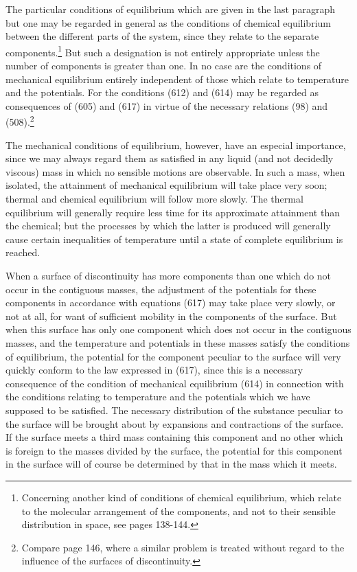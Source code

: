 \documentclass[12pt]{memoir}
\begin{document}
The particular conditions of equilibrium which are given in the last paragraph but one may be regarded in general as the conditions of chemical equilibrium  between the different parts of the system, since they relate to the separate components.\footnote{Concerning another kind of conditions of chemical equilibrium, which relate to the molecular arrangement of the components, and not to their sensible distribution in space, see pages 138-144.} But such a designation is not entirely appropriate unless the number of components is greater than one. In no case are the conditions of mechanical equilibrium entirely independent of those which relate to temperature and the potentials. For the conditions (612) and (614) may be regarded as consequences of (605) and (617) in virtue of the necessary relations (98) and (508).\footnote{Compare page 146, where a similar problem is treated without regard to the influence of the surfaces of discontinuity.}

The mechanical conditions of equilibrium, however, have an especial importance, since we may always regard them as satisfied in any liquid (and not decidedly viscous) mass in which no sensible motions are observable. In such a mass, when isolated, the attainment of mechanical equilibrium will take place very soon; thermal and chemical equilibrium will follow more slowly. The thermal equilibrium will generally require less time for its approximate attainment than the chemical; but the processes by which the latter is produced will generally cause certain inequalities of temperature until a state of complete equilibrium is reached.

When a surface of discontinuity has more components than one which do not occur in the contiguous masses, the adjustment of the potentials for these components in accordance with equations (617) may take place very slowly, or not at all, for want of sufficient mobility in the components of the surface. But when this surface has only one component which does not occur in the contiguous masses, and the temperature and potentials in these masses satisfy the conditions of equilibrium, the potential for the component peculiar to the surface will very quickly conform to the law expressed in (617), since this is a necessary consequence of the condition of mechanical equilibrium (614) in connection with the conditions relating to temperature and the potentials which we have supposed to be satisfied. The necessary distribution of the substance peculiar to the surface will be brought about by expansions and contractions of the surface. If the surface meets a third mass containing this component and no other which is foreign to the masses divided by the surface, the potential for this component in the surface will of course be determined by that in the mass which it meets.
\end{document}
